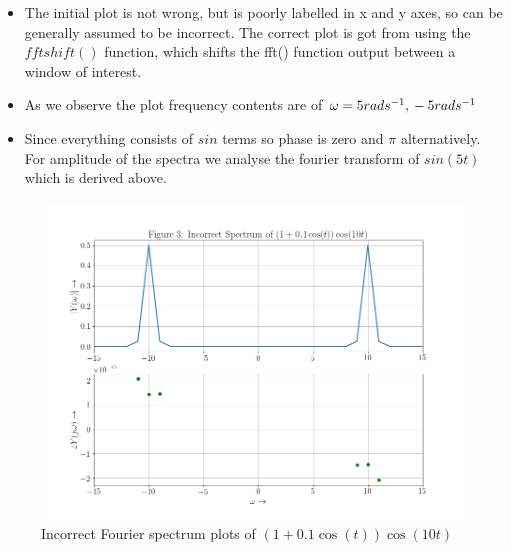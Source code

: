 \documentclass[11pt, a4paper]{article}
\begin{document}
\begin{itemize}
\item
  The initial plot is not wrong, but is poorly labelled in x and y axes, so 
  can be generally assumed to be incorrect. The correct plot is got from using the $fftshift()$ function,
  which shifts the fft() function output between a window of interest.
  \item
  As we observe the plot frequency contents are of
  \(\omega = 5rads^{-1} ,\newline -5 rads^{-1}\)
\item
  Since everything consists of \(sin\) terms so phase is zero and
  \(\pi\) alternatively. For amplitude of the spectra we analyse the
  fourier transform of \(sin(5t)\) which is derived above.
\end{itemize}
\newpage 
\begin{figure}[!tbh]
  \includegraphics[scale=0.5]{./../Extras/fig9-3.png}  %
  \caption{Incorrect Fourier spectrum plots of $\left(1+0.1\cos\left(t\right)\right)\cos\left(10t\right)$}
\end{figure}
\newpage
\end{document}
